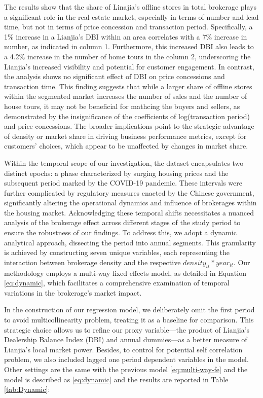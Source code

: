 \documentclass[11pt]{article}
\begin{document}
The results show that the share of Linajia's offline stores in total brokerage plays a significant role in the real estate market, especially in terms of number and lead time, but not in terms of price concession and transaction period. Specifically, a 1\% increase in a Lianjia's DBI within an area correlates with a 7\% increase in number, as indicated in column 1. Furthermore, this increased DBI also leads to a 4.2\% increase in the number of home tours in the column 2, underscoring the Lianjia's increased visibility and potential for customer engagement. In contrast, the analysis shows no significant effect of DBI on price concessions and transaction time. This finding suggests that while a larger share of offline stores within the segmented market increases the number of sales and the number of house tours, it may not be beneficial for mathcing the buyers and sellers, as demonstrated by the insignificance of the coefficients of log(transaction period) and price concessions. The broader implications point to the strategic advantage of density or market share in driving business performance metrics, except for customers' choices, which appear to be unaffected by changes in market share.

Within the temporal scope of our investigation, the dataset encapsulates two distinct epochs: a phase characterized by surging housing prices and the subsequent period marked by the COVID-19 pandemic. These intervals were further complicated by regulatory measures enacted by the Chinese government, significantly altering the operational dynamics and influence of brokerages within the housing market. Acknowledging these temporal shifts necessitates a nuanced analysis of the brokerage effect across different stages of the study period to ensure the robustness of our findings. To address this, we adopt a dynamic analytical approach, dissecting the period into annual segments. This granularity is achieved by constructing seven unique variables, each representing the interaction between brokerage density and the respective $density_{it} * year_{it}$. Our methodology employs a multi-way fixed effects model, as detailed in Equation \eqref{eq:dynamic}, which facilitates a comprehensive examination of temporal variations in the brokerage's market impact.

In the construction of our regression model, we deliberately omit the first period to avoid multicollinearity problem, treating it as a baseline for comparison. This strategic choice allows us to refine our proxy variable—the product of Lianjia's Dealership Balance Index (DBI) and annual dummies—as a better measure of Lianjia's local market power. Besides, to control for potential self correlation problem, we also included lagged one period dependent variables in the model. Other settings are the same with the previous model \eqref{eq:multi-way-fe} and the model is described as \eqref{eq:dynamic} and the results are reported in Table \ref{tab:Dynamic}: 
\end{document}
